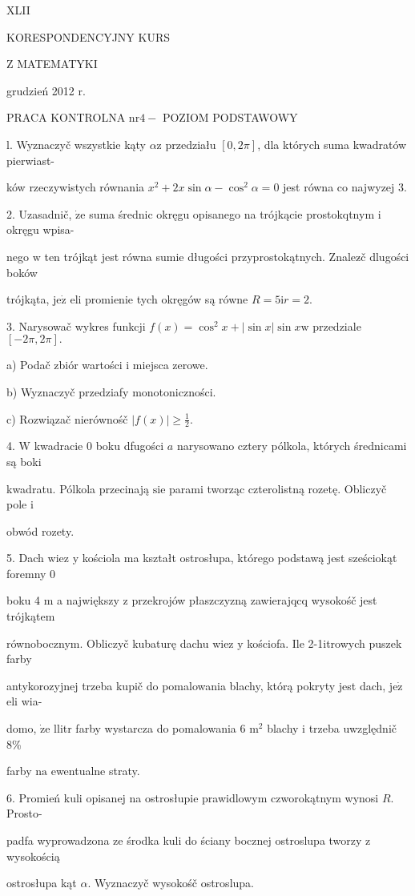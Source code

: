 \documentclass[a4paper,12pt]{article}
\begin{document}
XLII

KORESPONDENCYJNY KURS

Z MATEMATYKI

grudzień 2012 r.

PRACA KONTROLNA $\mathrm{n}\mathrm{r} 4-$ POZIOM PODSTAWOWY

l. Wyznaczyč wszystkie kąty $\alpha \mathrm{z}$ przedziału $[0,2\pi]$, dla których suma kwadratów pierwiast-

ków rzeczywistych równania $x^{2}+2x\sin\alpha-\cos^{2}\alpha=0$ jest równa co najwyzej 3.

2. Uzasadnič, $\dot{\mathrm{z}}\mathrm{e}$ suma średnic okręgu opisanego na trójkącie prostokqtnym $\mathrm{i}$ okręgu wpisa-

nego $\mathrm{w}$ ten trójkąt jest równa sumie długości przyprostokątnych. Znalez$\acute{}$č dlugości boków

trójkąta, $\mathrm{j}\mathrm{e}\dot{\mathrm{z}}$ eli promienie tych okręgów są równe $R=5\mathrm{i}r=2.$

3. Narysowač wykres funkcji $f(x)=\cos^{2}x+|\sin x|\sin x \mathrm{w}$ przedziale $[-2\pi,2\pi].$

a) Podač zbiór wartości $\mathrm{i}$ miejsca zerowe.

b) Wyznaczyč przedziafy monotoniczności.

c) Rozwiązač nierównośč $|f(x)|\displaystyle \geq\frac{1}{2}.$

4. $\mathrm{W}$ kwadracie $0$ boku dfugości $a$ narysowano cztery pólkola, których średnicami są boki

kwadratu. Pólkola przecinają $\mathrm{s}\mathrm{i}\mathrm{e}$ parami tworząc czterolistną rozetę. Obliczyč pole $\mathrm{i}$

obwód rozety.

5. Dach wiez $\mathrm{y}$ kościola ma kształt ostrosłupa, którego podstawą jest sześciokąt foremny $0$

boku 4 $\mathrm{m}$ a największy $\mathrm{z}$ przekrojów płaszczyzną zawierajqcq wysokośč jest trójkątem

równobocznym. Obliczyč kubaturę dachu wiez $\mathrm{y}$ kościofa. Ile 2-1itrowych puszek farby

antykorozyjnej trzeba kupič do pomalowania blachy, którą pokryty jest dach, $\mathrm{j}\mathrm{e}\dot{\mathrm{z}}$ eli wia-

domo, $\dot{\mathrm{z}}\mathrm{e}$ llitr farby wystarcza do pomalowania 6 $\mathrm{m}^{2}$ blachy $\mathrm{i}$ trzeba uwzględnič 8\%

farby $\mathrm{n}\mathrm{a}$ ewentualne straty.

6. Promień kuli opisanej na ostrosłupie prawidlowym czworokątnym wynosi $R$. Prosto-

padfa wyprowadzona ze środka kuli do ściany bocznej ostroslupa tworzy $\mathrm{z}$ wysokością

ostrosłupa kąt $\alpha$. Wyznaczyč wysokośč ostroslupa.
\end{document}
